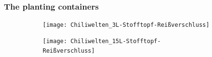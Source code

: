 \documentclass[
    12pt,
    aspectratio=1610,
    bibliography=../bibliography.bib,
    link-citations]{beamer}
\begin{document}
    \begin{frame}
        \frametitle{The planting containers}
        \begin{figure}
            \begin{subfigure}[t]{.48\textwidth}
                \texttt{[image: Chiliwelten\_3L-Stofftopf-Reißverschluss]}
            \end{subfigure}
            \hfill
            \begin{subfigure}[t]{.48\textwidth}
                \texttt{[image: Chiliwelten\_15L-Stofftopf-Reißverschluss]}
            \end{subfigure}
        \end{figure}
    \end{frame}
\end{document}
